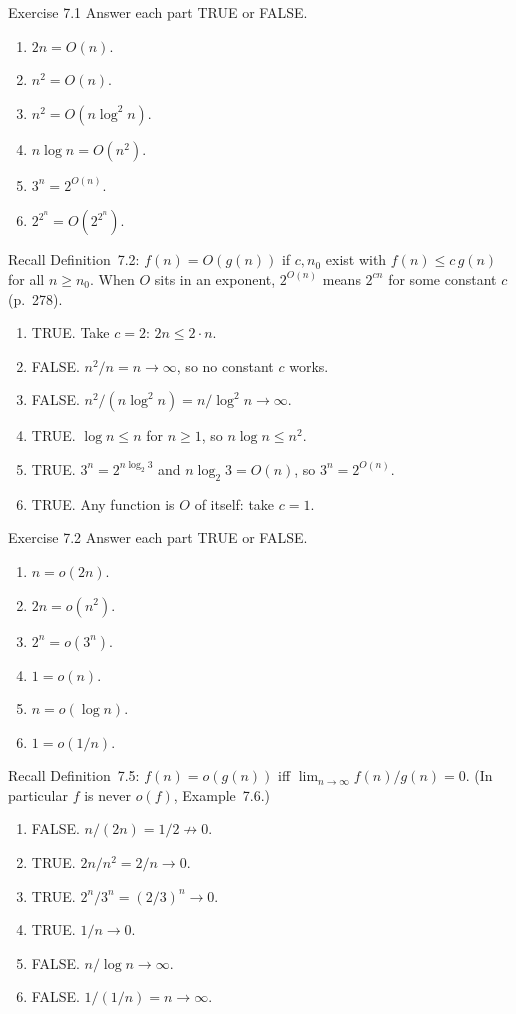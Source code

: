 \begin{question}{Exercise 7.1}
Answer each part TRUE or FALSE.
\begin{enumerate}[label=\alph*.]
\item $2n=O(n)$.
\item $n^2=O(n)$.
\item $n^2=O(n\log^2 n)$.
\item $n\log n=O(n^2)$.
\item $3^n=2^{O(n)}$.
\item $2^{2^n}=O(2^{2^n})$.
\end{enumerate}
\end{question}
\begin{soln}
Recall Definition~7.2: $f(n)=O(g(n))$ if $c,n_0$ exist with $f(n)\le c\,g(n)$ for all $n\ge n_0$. When $O$ sits in an exponent, $2^{O(n)}$ means $2^{cn}$ for some constant $c$ (p.~278).
\begin{enumerate}[label=\alph*.]
\item TRUE. Take $c=2$: $2n\le 2\cdot n$.
\item FALSE. $n^2/n=n\to\infty$, so no constant $c$ works.
\item FALSE. $n^2/(n\log^2 n)=n/\log^2 n\to\infty$.
\item TRUE. $\log n\le n$ for $n\ge 1$, so $n\log n\le n^2$.
\item TRUE. $3^n=2^{n\log_2 3}$ and $n\log_2 3=O(n)$, so $3^n=2^{O(n)}$.
\item TRUE. Any function is $O$ of itself: take $c=1$.
\end{enumerate}
\end{soln}

\begin{question}{Exercise 7.2}
Answer each part TRUE or FALSE.
\begin{enumerate}[label=\alph*.]
\item $n=o(2n)$.
\item $2n=o(n^2)$.
\item $2^n=o(3^n)$.
\item $1=o(n)$.
\item $n=o(\log n)$.
\item $1=o(1/n)$.
\end{enumerate}
\end{question}
\begin{soln}
Recall Definition~7.5: $f(n)=o(g(n))$ iff $\lim_{n\to\infty}f(n)/g(n)=0$. (In particular $f$ is never $o(f)$, Example~7.6.)
\begin{enumerate}[label=\alph*.]
\item FALSE. $n/(2n)=1/2\not\to 0$.
\item TRUE. $2n/n^2=2/n\to 0$.
\item TRUE. $2^n/3^n=(2/3)^n\to 0$.
\item TRUE. $1/n\to 0$.
\item FALSE. $n/\log n\to\infty$.
\item FALSE. $1/(1/n)=n\to\infty$.
\end{enumerate}
\end{soln}

